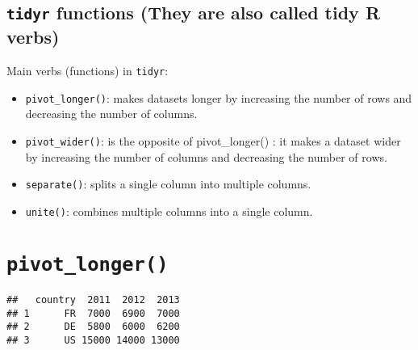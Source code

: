 \documentclass[]{article}
\newenvironment{Shaded}{\begin{snugshade}}{\end{snugshade}}
\newcommand{\CommentTok}[1]{\textcolor[rgb]{0.56,0.35,0.01}{\textit{#1}}}
\newcommand{\DataTypeTok}[1]{\textcolor[rgb]{0.13,0.29,0.53}{#1}}
\newcommand{\DecValTok}[1]{\textcolor[rgb]{0.00,0.00,0.81}{#1}}
\newcommand{\KeywordTok}[1]{\textcolor[rgb]{0.13,0.29,0.53}{\textbf{#1}}}
\newcommand{\NormalTok}[1]{#1}
\newcommand{\OperatorTok}[1]{\textcolor[rgb]{0.81,0.36,0.00}{\textbf{#1}}}
\newcommand{\StringTok}[1]{\textcolor[rgb]{0.31,0.60,0.02}{#1}}
\begin{document}
\hypertarget{tidyr-functions-they-are-also-called-tidy-r-verbs}{%
\subsection{\texorpdfstring{\texttt{tidyr} functions (They are also
called tidy R
verbs)}{tidyr functions (They are also called tidy R verbs)}}\label{tidyr-functions-they-are-also-called-tidy-r-verbs}}

Main verbs (functions) in \texttt{tidyr}:

\begin{itemize}
\item
  \texttt{pivot\_longer()}: makes datasets longer by increasing the
  number of rows and decreasing the number of columns.
\item
  \texttt{pivot\_wider()}: is the opposite of pivot\_longer() : it makes
  a dataset wider by increasing the number of columns and decreasing the
  number of rows.
\item
  \texttt{separate()}: splits a single column into multiple columns.
\item
  \texttt{unite()}: combines multiple columns into a single column.
\end{itemize}

\hypertarget{pivot_longer}{%
\section{\texorpdfstring{\texttt{pivot\_longer()}}{pivot\_longer()}}\label{pivot_longer}}

\begin{Shaded}
\end{Shaded}

\begin{verbatim}
##   country  2011  2012  2013
## 1      FR  7000  6900  7000
## 2      DE  5800  6000  6200
## 3      US 15000 14000 13000
\end{verbatim}

\begin{Shaded}
\end{Shaded}
\end{document}

